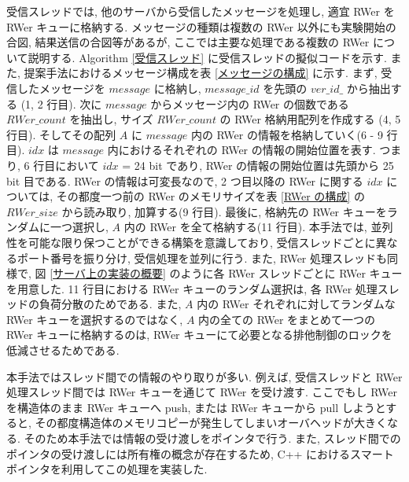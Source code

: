 受信スレッドでは, 他のサーバから受信したメッセージを処理し, 適宜 RWer を RWer キューに格納する. メッセージの種類は複数の RWer 以外にも実験開始の合図, 結果送信の合図等があるが, ここでは主要な処理である複数の RWer について説明する. Algorithm \ref{受信スレッド} に受信スレッドの擬似コードを示す. また, 提案手法におけるメッセージ構成を表 \ref{メッセージの構成} に示す. まず, 受信したメッセージを $message$ に格納し, $message\_id$ を先頭の $ver\_id\_$ から抽出する (1, 2 行目). 次に $message$ からメッセージ内の RWer の個数である $RWer\_count$ を抽出し, サイズ $RWer\_count$ の RWer 格納用配列を作成する (4, 5 行目). そしてその配列 $A$ に $message$ 内の RWer の情報を格納していく(6 - 9 行目). $idx$ は $message$ 内におけるそれぞれの RWer の情報の開始位置を表す. つまり, 6 行目において $idx$ = 24 bit であり, RWer の情報の開始位置は先頭から 25 bit 目である. RWer の情報は可変長なので, 2 つ目以降の RWer に関する $idx$ については, その都度一つ前の RWer のメモリサイズを表 \ref{RWer の構成} の $RWer\_size$ から読み取り, 加算する(9 行目). 最後に, 格納先の RWer キューをランダムに一つ選択し, $A$ 内の RWer を全て格納する(11 行目). 本手法では, 並列性を可能な限り保つことができる構築を意識しており, 受信スレッドごとに異なるポート番号を振り分け, 受信処理を並列に行う. また, RWer 処理スレッドも同様で, 図 \ref{サーバ上の実装の概要} のように各 RWer スレッドごとに RWer キューを用意した. 11 行目における RWer キューのランダム選択は, 各 RWer 処理スレッドの負荷分散のためである. また, $A$ 内の RWer それぞれに対してランダムな RWer キューを選択するのではなく, $A$ 内の全ての RWer をまとめて一つの RWer キューに格納するのは, RWer キューにて必要となる排他制御のロックを低減させるためである. 

本手法ではスレッド間での情報のやり取りが多い. 例えば, 受信スレッドと RWer 処理スレッド間では RWer キューを通じて RWer を受け渡す. ここでもし RWer を構造体のまま RWer キューへ push, または RWer キューから pull しようとすると, その都度構造体のメモリコピーが発生してしまいオーバヘッドが大きくなる. そのため本手法では情報の受け渡しをポインタで行う. また, スレッド間でのポインタの受け渡しには所有権の概念が存在するため, C++ におけるスマートポインタを利用してこの処理を実装した. 

